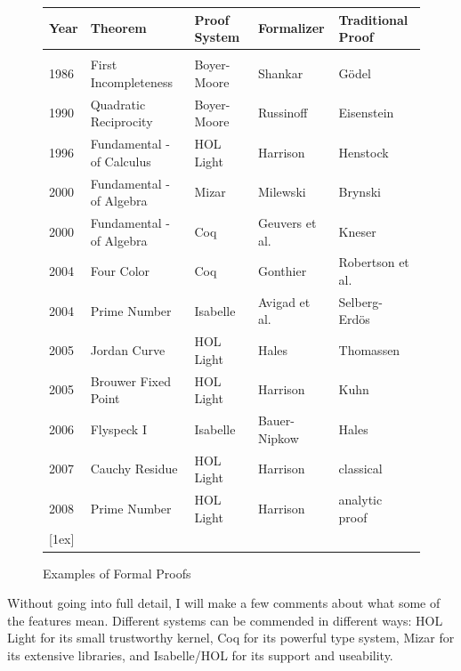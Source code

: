 \documentclass{llncs}
\begin{document}
\begin{figure}[h!]
\centering
\begin{tabular}{l l l l l}
\hline
Year\hspace{0.5em} &Theorem\hspace{8em} &Proof System\hspace{2em}  &Formalizer\hspace{3em} &Traditional Proof\\ [0.5ex]
\hline \\
1986 &First Incompleteness &Boyer-Moore   &Shankar &G\"odel \\
1990 &Quadratic Reciprocity&Boyer-Moore &Russinoff &Eisenstein\\
1996 &Fundamental - of Calculus &HOL Light &Harrison &Henstock\\
2000 &Fundamental - of Algebra &Mizar &Milewski    &Brynski\\ %
2000 &Fundamental - of Algebra &Coq &Geuvers et al.   &Kneser\\
2004 &Four Color &Coq &Gonthier &Robertson et al.\\
2004 &Prime Number &Isabelle &Avigad et al. &Selberg-Erd\"os\\
2005 &Jordan Curve  &HOL Light &Hales &Thomassen \\
2005 &Brouwer Fixed Point &HOL Light &Harrison &Kuhn \\
2006 &Flyspeck I &Isabelle &Bauer-Nipkow &Hales \\
2007 &Cauchy Residue &HOL Light &Harrison &classical \\
2008 &Prime Number &HOL Light &Harrison &analytic proof \\
 [1ex]
\hline
\end{tabular}
\caption{Examples of Formal Proofs}
\label{fig:table}
\end{figure}



Without going into full detail, I will make a few comments
about what some of the features mean.  Different systems can be
commended in different ways: HOL Light for its small trustworthy
kernel, Coq for its powerful type system, Mizar for its extensive
libraries, and Isabelle/HOL for its support and useability.
\end{document}
